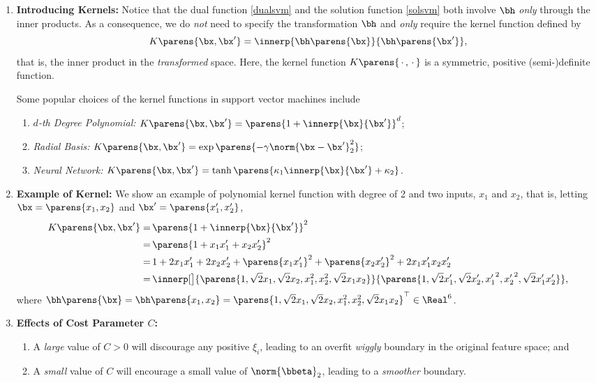 \documentclass[12pt]{article}
\begin{document}
\begin{enumerate}[label=\textbf{\arabic*.}]
	\item \textbf{Introducing Kernels:} Notice that the dual function \eqref{dualsvm} and the solution function \eqref{solsvm} both involve $\bh$ \emph{only} through the inner products. As a consequence, we do \emph{not} need to specify the transformation $\bh$ and \emph{only} require the kernel function defined by 
	\begin{equation*}
		K \parens{\bx, \bx'} = \innerp{\bh \parens{\bx}}{\bh \parens{\bx'}}, 
	\end{equation*}
	that is, the inner product in the \emph{transformed} space. Here, the kernel function $K \parens{\,\cdot\,, \,\cdot\,}$ is a symmetric, positive (semi-)definite function. 
	
	Some popular choices of the kernel functions in support vector machines include 
	\begin{enumerate}
		\item \textit{$d$-th Degree Polynomial:} $K \parens{\bx, \bx'} = \parens{1 + \innerp{\bx}{\bx'}}^d$; 
		\item \textit{Radial Basis:} $K \parens{\bx, \bx'} = \exp \parens{-\gamma \norm{\bx - \bx'}_2^2}$; 
		\item \textit{Neural Network:} $K \parens{\bx, \bx'} = \tanh \parens{\kappa_1 \innerp{\bx}{\bx'} + \kappa_2}$. 
	\end{enumerate}
	
	\item \textbf{Example of Kernel:} We show an example of polynomial kernel function with degree of 2 and two inputs, $x_1$ and $x_2$, that is, letting $\bx = \parens{x_1, x_2}$ and $\bx' = \parens{x'_1, x'_2}$, 
	\begin{align*}
			K \parens{\bx, \bx'} = & \, \parens{1 + \innerp{\bx}{\bx'}}^2 \\ 
			= & \, \parens{1 + x_1x_1' + x_2x_2'}^2 \\ 
			= & \, 1 + 2x_1x_1' + 2x_2x_2' + \parens{x_1 x_1'}^2 + \parens{x_2 x_2'}^2 + 2 x_1 x_1' x_2 x_2' \\
			= & \, \innerp[\big]{ \parens{1, \sqrt{2} x_1, \sqrt{2} x_2, x_1^2, x_2^2, \sqrt{2} x_1 x_2}}{ \parens{1, \sqrt{2} x'_1, \sqrt{2}x'_2, {x'_1}^2, {x'_2}^2, \sqrt{2} x'_1 x'_2}}, 
	\end{align*}
	where $\bh \parens{\bx} = \bh \parens{x_1, x_2} = \parens{1, \sqrt{2} x_1, \sqrt{2} x_2, x_1^2, x_2^2, \sqrt{2}x_1 x_2}^{\top} \in \Real^6$. 
	
	\item \textbf{Effects of Cost Parameter $C$:} 
	\begin{enumerate}
		\item A \textit{large} value of $C > 0$ will discourage any positive $\xi_i$, leading to an overfit \emph{wiggly} boundary in the original feature space; and 
		\item A \textit{small} value of $C$ will encourage a small value of $\norm{\bbeta}_2$, leading to a \emph{smoother} boundary. 
	\end{enumerate}
	

\end{enumerate}
\end{document}
